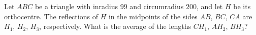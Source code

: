 Let $ABC$ be a triangle with inradius $99$ and circumradius $200$, and let $H$ be its orthocentre. The reflections of $H$ in the midpoints of the sides $AB$, $BC$, $CA$ are $H_1$, $H_2$, $H_3$, respectively. What is the average of the lengths $CH_1$, $AH_2$, $BH_3$?
